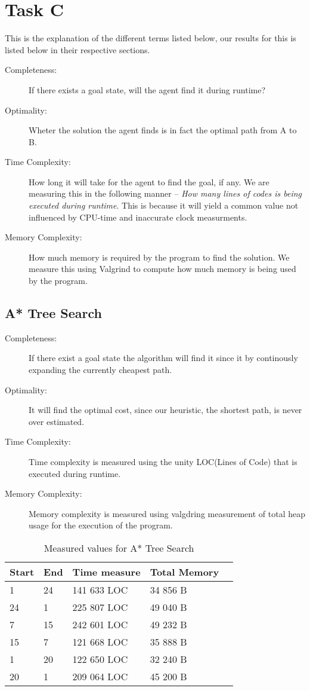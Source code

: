 
\chapter{Task C}
This is the explanation of the different terms listed below, our results for
this is listed below in their respective sections.
\begin{description}
\item[Completeness:			]
	If there exists a goal state, will the agent find it during runtime?
\item[Optimality:				]
	Wheter the solution the agent finds is in fact the optimal path from A to B.
\item[Time Complexity:	]
	How long it will take for the agent to find the goal, if any.  We are
	measuring this in the following manner -- \textit{How many lines of codes is
	being executed during runtime}.  This is because it will yield a common value
	not influenced by CPU-time and inaccurate clock measurments.
\item[Memory Complexity:]
	How much memory is required by the program to find the solution. We measure
	this using Valgrind to compute how much memory is being used by the program.
\end{description}

\section{A* Tree Search}
\begin{description}
\item[Completeness:			]	If there exist a goal state the algorithm will find it
	since it by continously expanding the currently cheapest path.
\item[Optimality:				]	It will find the optimal cost, since our heuristic,
	the shortest path, is never over estimated.
\item[Time Complexity:	]	Time complexity is measured using the unity LOC(Lines
	of Code) that is executed during runtime.
\item[Memory Complexity:]	Memory complexity is measured using valgdring
	measurement of total heap usage for the execution of the program.
\end{description}

\begin{table}[h]
\centering
\begin{tabular}{	p{} p{} 
									p{} p{} 
									p{} }\hline
	Start & End & Time measure & Total Memory \\\hline
	1		&	24 	& 141 633 LOC	&	34 856 B\\
	24	&	1 	& 225 807 LOC	&	49 040 B\\
	7		&	15 	& 242 601 LOC	&	49 232 B\\
	15	&	7 	& 121 668 LOC	&	35 888 B\\
	1		&	20 	& 122 650 LOC	&	32 240 B\\
	20	&	1		&	209 064 LOC	&	45 200 B\\
\end{tabular}
\caption{Measured values for A* Tree Search}\label{tbl:sumTree}
\end{table}

